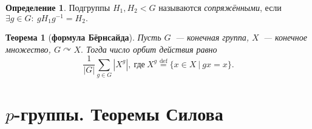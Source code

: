 \documentclass[a4paper, 14pt]{extarticle}
\newcommand{\deq}{\stackrel{\mathrm{def}}{=}}
\theoremstyle{definition}
\newtheorem{definition}{Определение}
\theoremstyle{plain}
\newtheorem*{theorem*}{Теорема}
\numberwithin{theorem}{section}
\numberwithin{definition}{section}
\numberwithin{statement}{section}
\numberwithin{lemma}{section}
\numberwithin{consequence}{section}
\begin{document}
        \begin{definition}
            Подгруппы $H_1, H_2 < G$ называются \textit{сопряжёнными}, если $\exists g \in G{:} \ gH_1g^{-1} = H_2.$
        \end{definition}
        \begin{theorem*}[\textbf{формула Бёрнсайда}]
            Пусть $G$~--- конечная группа, $X$~--- конечное множество, ${G \curvearrowright X.}$ Тогда число орбит действия равно
            \begin{equation*}
                \frac{1}{|G|} \sum_{g \in G} |X^g|, \  \textrm{где} \ X^g \deq \{x \in X \ | \ gx = x\}.
            \end{equation*}
        \end{theorem*}
        
        \newpage
	\section{$p$-группы. Теоремы Силова}
	\setcounter{definition}{0}
    
        \newpage
\end{document}
